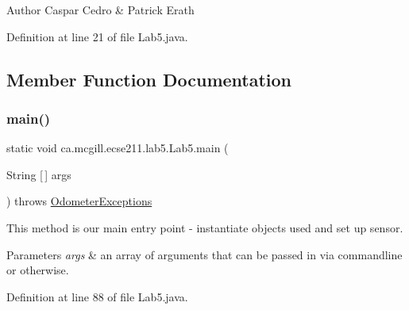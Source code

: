 \begin{DoxyAuthor}{Author}
Caspar Cedro \& Patrick Erath 
\end{DoxyAuthor}


Definition at line 21 of file Lab5.\+java.



\subsection{Member Function Documentation}
\mbox{\label{classca_1_1mcgill_1_1ecse211_1_1lab5_1_1_lab5_a82cca51f550ed0eb016bb2082d3fe755}} 
\subsubsection{\texorpdfstring{main()}{main()}}
{\footnotesize\ttfamily static void ca.\+mcgill.\+ecse211.\+lab5.\+Lab5.\+main (\begin{DoxyParamCaption}\item[{String \mbox{[}$\,$\mbox{]}}]{args }\end{DoxyParamCaption}) throws \hyperlink{classca_1_1mcgill_1_1ecse211_1_1odometer_1_1_odometer_exceptions}{Odometer\+Exceptions}\hspace{0.3cm}{\ttfamily [static]}}

This method is our main entry point -\/ instantiate objects used and set up sensor.


\begin{DoxyParams}{Parameters}
{\em args} & an array of arguments that can be passed in via commandline or otherwise. \\
\hline
\end{DoxyParams}


Definition at line 88 of file Lab5.\+java.

